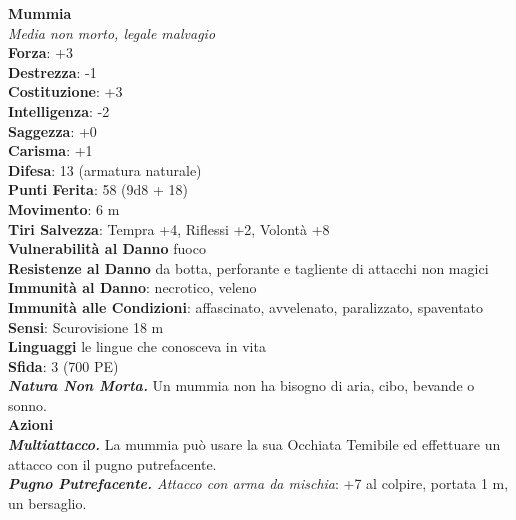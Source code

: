 \begin{multicols}{2}
\medskip\textbf{Mummia}\\
\emph{Media non morto, legale malvagio}\\
\textbf{Forza}: +3\\
\textbf{Destrezza}: -1\\
\textbf{Costituzione}: +3\\
\textbf{Intelligenza}: -2\\
\textbf{Saggezza}: +0\\
\textbf{Carisma}: +1\\
\textbf{Difesa}: 13 (armatura naturale)\\
\textbf{Punti Ferita}: 58 (9d8 + 18)\\
\textbf{Movimento}: 6 m\\
\textbf{Tiri Salvezza}: Tempra +4, Riflessi +2, Volontà +8\\
\textbf{Vulnerabilità al Danno} fuoco\\
\textbf{Resistenze al Danno} da botta, perforante e tagliente di attacchi non magici\\
\textbf{Immunità al Danno}: necrotico, veleno\\
\textbf{Immunità alle Condizioni}: affascinato, avvelenato, paralizzato, spaventato\\
\textbf{Sensi}: Scurovisione 18 m \\
\textbf{Linguaggi} le lingue che conosceva in vita\\
\textbf{Sfida}: 3 (700 PE)\smallskip\\
\emph{\textbf{Natura Non Morta.}} Un mummia non ha bisogno di aria, cibo, bevande o sonno.\\
\smallskip\textbf{Azioni}\\
\emph{\textbf{Multiattacco.}} La mummia può usare la sua Occhiata Temibile ed effettuare un attacco con il pugno putrefacente.\\

\emph{\textbf{Pugno Putrefacente.} Attacco con arma da mischia}: +7 al colpire, portata 1 m, un bersaglio.\\


\end{multicols}
